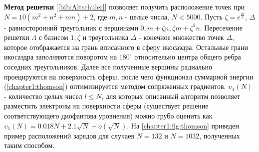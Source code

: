 \textbf{Метод решетки} [\ref{bib:Altschuler}] позволяет получить расположение точек при $N = 10(m^2 + n^2 + mn) + 2$, 
где $m,n$ - целые числа, $N < 5000$. 
Пусть $\zeta = e^{\frac{i\pi}{3}}$, $\Delta$ - 
равносторонний треугольник с вершинами $0, m + \zeta n, \zeta m + \zeta^2 n$. Пересечение решетки $\Lambda$ с базисом $1, \zeta$ 
и треугольника $\Delta$ - конечное множество точек $\Delta$, которое отображается на грань вписанного в сферу икосаэдра. 
Остальные грани икосаэдра заполняются поворотом на $180^{\circ}$ относительно центра общего ребра соседних треугольников. 
Далее все полученные вершины радиально проецируются на поверхность сферы, после чего функционал суммарной энергии 
(\ref{chapter1:thomson}) оптимизируется методом сопряженных градиентов. 
$\upsilon_1(N)$ - количество целых чисел $l \le N$, для которых описанный алгоритм позволяет разместить электроны 
на поверхности сферы (существует решение соответствующего диофантова уровнения) можно грубо оценить как
$\upsilon_1(N) = 0.018N + 2.1\sqrt{N} + o(\sqrt{N})$.
На \figurename{ \ref{chapter1:fig:thomson}} приведен пример расположений зарядов для случаев $N=132$ и $N=1032$, полученных таким способом.

